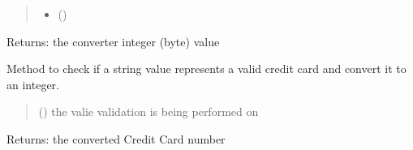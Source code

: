 \documentclass[letterpaper,10pt,english]{sphinxmanual}
\begin{document}
\begin{fulllineitems}
\begin{fulllineitems}
\begin{quote}
\begin{description}
\begin{itemize}
\item {} 
\sphinxAtStartPar
{} (\sphinxstyleliteralemphasis{\sphinxupquote{) }}\sphinxstyleliteralemphasis{\sphinxupquote{ (}})

\end{itemize}

\end{description}\end{quote}

\sphinxAtStartPar
Returns: the converter integer (byte) value

\end{fulllineitems}


\begin{fulllineitems}
\label{\detokenize{apache_commons_validator_python:apache_commons_validator_python.generic_type_validator_new.GenericTypeValidator.format_credit_card}}
\pysigstartsignatures
{}
\pysigstopsignatures
\sphinxAtStartPar
Method to check if a string value represents a valid credit card and convert
it to an integer.
\begin{quote}\begin{description}
\sphinxAtStartPar
{} () \textendash{} the valie validation is being performed on

\end{description}\end{quote}

\sphinxAtStartPar
Returns: the converted Credit Card number

\end{fulllineitems}


\end{fulllineitems}
\end{document}
